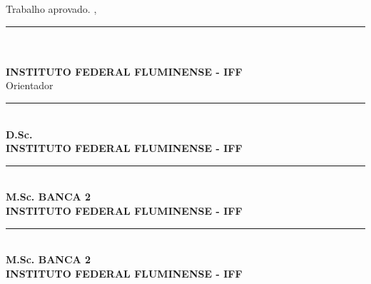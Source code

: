 \documentclass[
12pt,				%
openright,			%
oneside,			%
a4paper,			%
brazil,				%
]{abntex2}
\begin{document}
	\begin{folhadeaprovacao}
		
		\begin{center}
			{\ABNTEXchapterfont\large\imprimirautor}
			
			\vspace*{\fill}\vspace*{\fill}
			{\ABNTEXchapterfont\bfseries\Large\imprimirtitulo}
			\vspace*{\fill}
			
			\hspace{.45\textwidth}
			\begin{minipage}{.5\textwidth}
				\imprimirpreambulo
			\end{minipage}%
			\vspace*{\fill}
		\end{center}
		
		Trabalho aprovado. \imprimirlocal, %
		\vspace*{\fill}
		
		\centering
		\rule{10cm}{.3mm}\\
		\textbf{\imprimirorientador\\INSTITUTO FEDERAL FLUMINENSE - IFF\\} Orientador
		\vspace*{\fill}
		
		\rule{10cm}{.3mm}\\
		\textbf{ D.Sc. \\INSTITUTO FEDERAL FLUMINENSE - IFF}
		\vspace*{\fill}
		
		\rule{10cm}{.3mm}\\
		\textbf{ M.Sc. BANCA 2\\INSTITUTO FEDERAL FLUMINENSE - IFF}
		\vspace*{\fill}
		
		\rule{10cm}{.3mm}\\
		\textbf{ M.Sc. BANCA 2\\INSTITUTO FEDERAL FLUMINENSE - IFF}
		\vspace*{\fill}
		
		\begin{center}
			\vspace*{0.5cm}
			{\large\imprimirlocal}
			\par
			{\large\imprimirdata}
			\vspace*{1cm}
		\end{center}
		
	\end{folhadeaprovacao}
	
\end{document}
